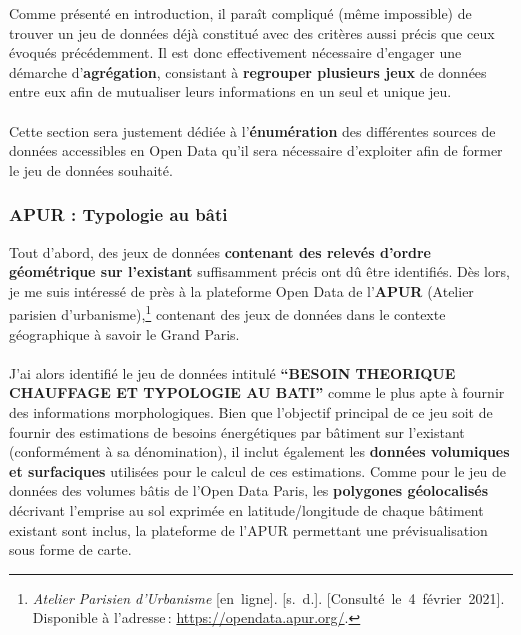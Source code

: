 \documentclass[
  11pt,
  french,
]{article}
\begin{document}
Comme présenté en introduction, il paraît compliqué (même impossible) de
trouver un jeu de données déjà constitué avec des critères aussi précis
que ceux évoqués précédemment. Il est donc effectivement nécessaire
d'engager une démarche d'\textbf{agrégation}, consistant à
\textbf{regrouper plusieurs jeux} de données entre eux afin de
mutualiser leurs informations en un seul et unique jeu.\\
~\\
Cette section sera justement dédiée à l'\textbf{énumération} des
différentes sources de données accessibles en Open Data qu'il sera
nécessaire d'exploiter afin de former le jeu de données souhaité.

\newpage

\hypertarget{apur-typologie-au-buxe2ti}{%
\subsubsection{APUR : Typologie au
bâti}\label{apur-typologie-au-buxe2ti}}

Tout d'abord, des jeux de données \textbf{contenant des relevés d'ordre
géométrique sur l'existant} suffisamment précis ont dû être identifiés.
Dès lors, je me suis intéressé de près à la plateforme Open Data de
l'\textbf{APUR} (Atelier parisien d'urbanisme),\footnote{\emph{Atelier
  Parisien d'Urbanisme} {[}en~ligne{]}. {[}s.~d.{]}.
  {[}Consulté~le~4~février~2021{]}. Disponible à l'adresse\,:
  \url{https://opendata.apur.org/}.} contenant des jeux de données dans
le contexte géographique à savoir le Grand Paris.\\
~\\
J'ai alors identifié le jeu de données intitulé \textbf{``BESOIN
THEORIQUE CHAUFFAGE ET TYPOLOGIE AU BATI''} comme le plus apte à fournir
des informations morphologiques. Bien que l'objectif principal de ce jeu
soit de fournir des estimations de besoins énergétiques par bâtiment sur
l'existant (conformément à sa dénomination), il inclut également les
\textbf{données volumiques et surfaciques} utilisées pour le calcul de
ces estimations. Comme pour le jeu de données des volumes bâtis de
l'Open Data Paris, les \textbf{polygones géolocalisés} décrivant
l'emprise au sol exprimée en latitude/longitude de chaque bâtiment
existant sont inclus, la plateforme de l'APUR permettant une
prévisualisation sous forme de carte.
\end{document}
